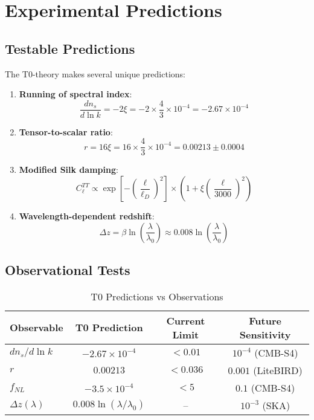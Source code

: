 \documentclass[12pt,a4paper]{article}
\newcommand{\xipar}{\xi}
\theoremstyle{definition}
\theoremstyle{remark}
\begin{document}
	\section{Experimental Predictions}
	\label{sec:predictions}
	
	\subsection{Testable Predictions}
	
	The T0-theory makes several unique predictions:
	
	\begin{enumerate}
		\item \textbf{Running of spectral index}:
		\begin{equation}
			\frac{dn_s}{d\ln k} = -2\xipar = -2 \times \frac{4}{3} \times 10^{-4} = -2.67 \times 10^{-4}
		\end{equation}
		
		\item \textbf{Tensor-to-scalar ratio}:
		\begin{equation}
			r = 16\xipar = 16 \times \frac{4}{3} \times 10^{-4} = 0.00213 \pm 0.0004
		\end{equation}
		
		\item \textbf{Modified Silk damping}:
		\begin{equation}
			C_\ell^{TT} \propto \exp\left[-\left(\frac{\ell}{\ell_D}\right)^2\right] \times \left(1 + \xipar \left(\frac{\ell}{3000}\right)^2\right)
		\end{equation}
		
		\item \textbf{Wavelength-dependent redshift}:
		\begin{equation}
			\Delta z = \beta \ln\left(\frac{\lambda}{\lambda_0}\right) \approx 0.008 \ln\left(\frac{\lambda}{\lambda_0}\right)
		\end{equation}
	\end{enumerate}
	
	\subsection{Observational Tests}
	
	\begin{table}[htbp]
		\centering
		\caption{T0 Predictions vs Observations}
		\begin{tabular}{lccc}
			\toprule
			Observable & T0 Prediction & Current Limit & Future Sensitivity \\
			\midrule
			$dn_s/d\ln k$ & $-2.67 \times 10^{-4}$ & $< 0.01$ & $10^{-4}$ (CMB-S4) \\
			$r$ & $0.00213$ & $< 0.036$ & $0.001$ (LiteBIRD) \\
			$f_{NL}$ & $-3.5 \times 10^{-4}$ & $< 5$ & $0.1$ (CMB-S4) \\
			$\Delta z(\lambda)$ & $0.008\ln(\lambda/\lambda_0)$ & -- & $10^{-3}$ (SKA) \\
			\bottomrule
		\end{tabular}
	\end{table}
	
\end{document}
